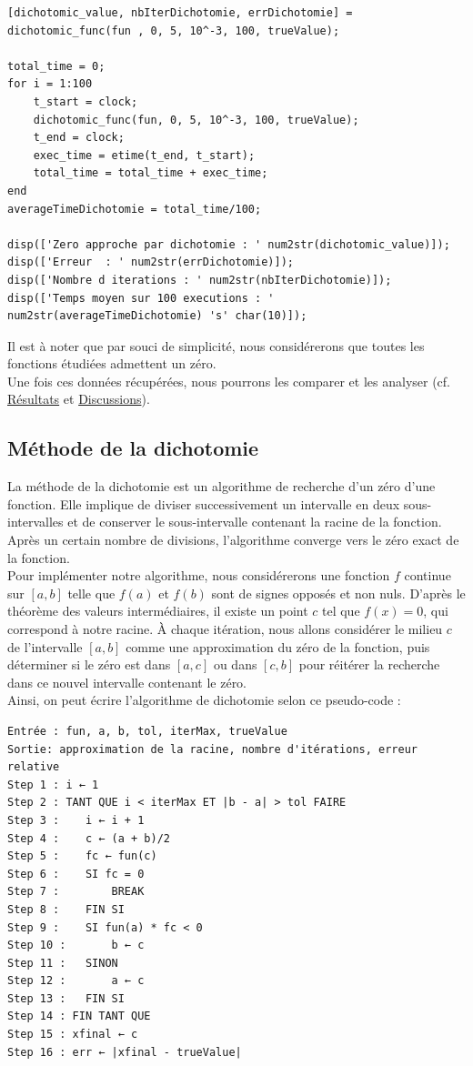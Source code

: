 \documentclass[12pt]{article}
\begin{document}
\begin{lstlisting}[caption={Récupération des données d'une méthode}]
[dichotomic_value, nbIterDichotomie, errDichotomie] = dichotomic_func(fun , 0, 5, 10^-3, 100, trueValue);

total_time = 0;
for i = 1:100
    t_start = clock;
    dichotomic_func(fun, 0, 5, 10^-3, 100, trueValue);
    t_end = clock;
    exec_time = etime(t_end, t_start);
    total_time = total_time + exec_time;
end
averageTimeDichotomie = total_time/100;

disp(['Zero approche par dichotomie : ' num2str(dichotomic_value)]);
disp(['Erreur  : ' num2str(errDichotomie)]);
disp(['Nombre d iterations : ' num2str(nbIterDichotomie)]);
disp(['Temps moyen sur 100 executions : ' num2str(averageTimeDichotomie) 's' char(10)]);
\end{lstlisting}
Il est à noter que par souci de simplicité, nous considérerons que toutes les fonctions étudiées admettent un zéro.\\
Une fois ces données récupérées, nous pourrons les comparer et les analyser (cf. \hyperref[ref:resultats]{Résultats} et \hyperref[ref:discussions]{Discussions}).\\


\subsection{Méthode de la dichotomie}
\label{ref:dichotomie}
\noindent La méthode de la dichotomie est un algorithme de recherche d'un zéro d'une fonction. Elle implique de diviser successivement un intervalle en deux sous-intervalles et de conserver le sous-intervalle contenant la racine de la fonction. Après un certain nombre de divisions, l'algorithme converge vers le zéro exact de la fonction.\\
Pour implémenter notre algorithme, nous considérerons une fonction $f$ continue sur $[a,b]$ telle que $f(a)$ et $f(b)$ sont de signes opposés et non nuls. D'après le théorème des valeurs intermédiaires, il existe un point $c$ tel que $f(x) = 0$, qui correspond à notre racine. À chaque itération, nous allons considérer le milieu $c$ de l'intervalle $[a,b]$ comme une approximation du zéro de la fonction, puis déterminer si le zéro est dans $[a,c]$ ou dans $[c,b]$ pour réitérer la recherche dans ce nouvel intervalle contenant le zéro.\\
Ainsi, on peut écrire l'algorithme de dichotomie selon ce pseudo-code :
\begin{verbatim}
Entrée : fun, a, b, tol, iterMax, trueValue
Sortie: approximation de la racine, nombre d'itérations, erreur relative
Step 1 : i ← 1
Step 2 : TANT QUE i < iterMax ET |b - a| > tol FAIRE
Step 3 :    i ← i + 1
Step 4 :    c ← (a + b)/2
Step 5 :    fc ← fun(c)
Step 6 :    SI fc = 0
Step 7 :        BREAK
Step 8 :    FIN SI
Step 9 :    SI fun(a) * fc < 0
Step 10 :       b ← c
Step 11 :   SINON
Step 12 :       a ← c
Step 13 :   FIN SI
Step 14 : FIN TANT QUE
Step 15 : xfinal ← c
Step 16 : err ← |xfinal - trueValue|
\end{verbatim}
\end{document}
